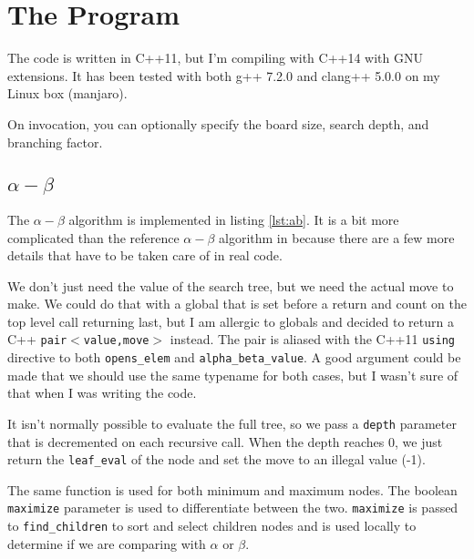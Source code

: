 \documentclass[12pt,titlepage]{amsart}
\begin{document}
\section{The Program}
\FloatBarrier

The code is written in C++11, but I'm compiling with C++14 with GNU extensions.
It has been tested with both g++ 7.2.0 and clang++ 5.0.0 on my Linux box
(manjaro).

On invocation, you can optionally specify the board size, search depth, and
branching factor.

\subsection{$\alpha-\beta$}

The $\alpha-\beta$ algorithm is implemented in listing \ref{lst:ab}. It is a bit
more complicated than the reference $\alpha-\beta$ algorithm in
\cite{RN:AIAMA:2003} because there are a few more details that have to be taken
care of in real code.

We don't just need the value of the search tree, but we need the actual move to
make. We could do that with a global that is set before a return and count on
the top level call returning last, but I am allergic to globals and decided to
return a C++ \texttt{pair$<$value,move$>$} instead. The pair is aliased with the
C++11 \texttt{using} directive to both \texttt{opens\_elem} and
\texttt{alpha\_beta\_value}. A good argument could be made that we should use
the same typename for both cases, but I wasn't sure of that when I was writing
the code.

It isn't normally possible to evaluate the full tree, so we pass a
\texttt{depth} parameter that is decremented on each recursive call. When the
depth reaches 0, we just return the \texttt{leaf\_eval} of the node and set the
move to an illegal value (-1).

The same function is used for both minimum and maximum nodes. The boolean
\texttt{maximize} parameter is used to differentiate between the two.
\texttt{maximize} is passed to \texttt{find\_children} to sort and select
children nodes and is used locally to determine if we are comparing with
$\alpha$ or $\beta$.
\end{document}
